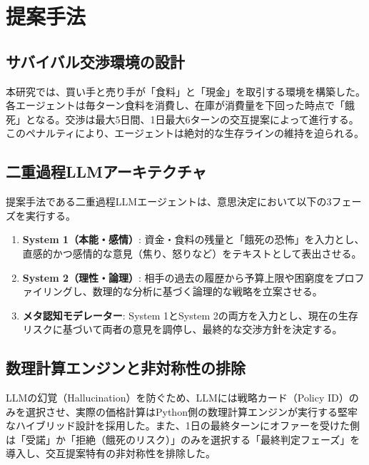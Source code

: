 \documentclass[11pt,a4paper]{ltjsarticle}
\begin{document}
\section{提案手法}
\subsection{サバイバル交渉環境の設計}
本研究では、買い手と売り手が「食料」と「現金」を取引する環境を構築した。各エージェントは毎ターン食料を消費し、在庫が消費量を下回った時点で「餓死」となる。交渉は最大5日間、1日最大6ターンの交互提案によって進行する。このペナルティにより、エージェントは絶対的な生存ラインの維持を迫られる。

\subsection{二重過程LLMアーキテクチャ}
提案手法である二重過程LLMエージェントは、意思決定において以下の3フェーズを実行する。
\begin{enumerate}
    \item \textbf{System 1（本能・感情）}: 資金・食料の残量と「餓死の恐怖」を入力とし、直感的かつ感情的な意見（焦り、怒りなど）をテキストとして表出させる。
    \item \textbf{System 2（理性・論理）}: 相手の過去の履歴から予算上限や困窮度をプロファイリングし、数理的な分析に基づく論理的な戦略を立案させる。
    \item \textbf{メタ認知モデレーター}: System 1とSystem 2の両方を入力とし、現在の生存リスクに基づいて両者の意見を調停し、最終的な交渉方針を決定する。
\end{enumerate}

\subsection{数理計算エンジンと非対称性の排除}
LLMの幻覚（Hallucination）を防ぐため、LLMには戦略カード（Policy ID）のみを選択させ、実際の価格計算はPython側の数理計算エンジンが実行する堅牢なハイブリッド設計を採用した。また、1日の最終ターンにオファーを受けた側は「受諾」か「拒絶（餓死のリスク）」のみを選択する「最終判定フェーズ」を導入し、交互提案特有の非対称性を排除した。

\end{document}
